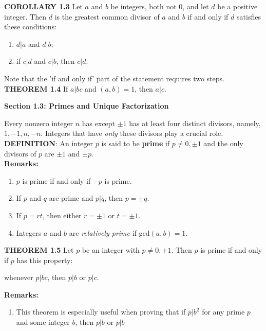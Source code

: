 \documentclass[12pt]{article}
\begin{document}

\noindent
\textbf{COROLLARY 1.3} Let $a$ and $b$ be integers, both not $0$, and let $d$ be a positive integer. Then $d$ is the greatest common divisor of $a$ and $b$ if and only if $d$ satisfies these conditions:
\begin{enumerate}
\item $d|a$ and $d|b$;
\item if $c|d$ and $c|b$, then $c|d$.
\end{enumerate}

\noindent
Note that the 'if and only if' part of the statement requires two steps. \\

\noindent
\textbf{THEOREM 1.4} If $a|bc$ and $(a,b)=1$, then $a|c$. \\

\begin{center}
\textbf{Section 1.3: Primes and Unique Factorization}
\end{center}

\noindent
Every nonzero integer $n$ has except $\pm 1$ has at least four distinct divisors, namely, $1,-1,n,-n$. Integers that have \textit{only} these divisors play a crucial role. \\

\noindent
\textbf{DEFINITION}: An integer $p$ is said to be \textbf{prime} if $p \neq 0, \pm1$ and the only divisors of $p$ are $\pm 1$ and $\pm p$. \\

\noindent
\textbf{Remarks:}
\begin{enumerate}[label=(\alph*)]
\item $p$ is prime if and only if $-p$ is prime.
\item If $p$ and $q$ are prime and $p|q$, then $p= \pm q$.
\item If $p=rt$, then either $r=\pm 1$ or $t=\pm 1$.
\item Integers $a$ and $b$ are \textit{relatively prime} if gcd$(a,b)=1$.
\end{enumerate}

\noindent
\textbf{THEOREM 1.5} Let $p$ be an integer with $p \neq 0, \pm1$. Then $p$ is prime if and only if $p$ has this property:
\begin{center}
whenever $p|bc$, then $p|b$ or $p|c$.
\end{center}

\noindent
\textbf{Remarks:}
\begin{enumerate}[label=(\alph*)]
\item This theorem is especially useful when proving that if $p|b^2$ for any prime $p$ and some integer $b$, then $p|b$ or $p|b$
\end{enumerate}
\end{document}
